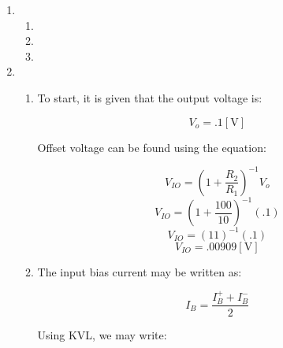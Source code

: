 \begin{enumerate}
\begin{enumerate}
        $$v_o-25(I_s-I)-10^{11}I=0$$
        $$v_o=25I_s-10^{11}I$$
        $$v_o=9.975\cdot10^{10}I$$

        Therefore, we may say that:

        $$\boxed{\frac{v_o}{V_s}\approx -10001}$$

        We can tell that the finite gain is approximately one-tenth of the ideal op-amp gain.

      \item 

        To find the impedance, we can use our equations from part (a) to write:

        $$Z_{in}=\frac{}$$

      \item 

    \end{enumerate}

  \item

    \begin{enumerate}

      \item 

      \item 

      \item 

    \end{enumerate}

  \item

    \begin{enumerate}

      \item 

        To start, it is given that the output voltage is:

        $$V_o=.1[\si{\volt}]$$

        Offset voltage can be found using the equation:

        $$V_{IO}=\left( 1+\frac{R_2}{R_1} \right)^{-1}V_o$$
        $$V_{IO}=\left( 1+\frac{100}{10} \right)^{-1}(.1)$$
        $$V_{IO}=\left( 11 \right)^{-1}(.1)$$
        $$\boxed{V_{IO}=.00909[\si{\volt}]}$$

      \item 

        The input bias current may be written as:

        $$I_B=\frac{I_B^++I_B^-}{2}$$

        Using KVL, we may write:


\end{enumerate}
\end{enumerate}
